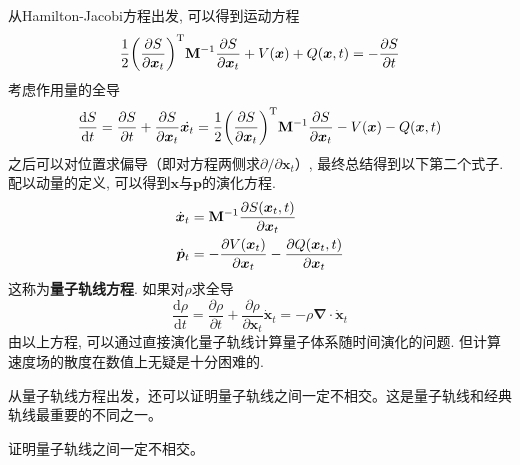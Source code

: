         从Hamilton-Jacobi方程出发, 可以得到运动方程
        \begin{equation}
            \frac 12 \bigg(\frac {\partial S}{\partial \bm{x}_t}\bigg)^{\mathrm{T}} \mathbf{M}^{-1} \frac {\partial S}{\partial \bm{x}_t} + V(\bm{x}) + Q(\bm{x}, t) = -\frac {\partial S}{\partial t}
        \end{equation}
        考虑作用量的全导
        \begin{equation}
            \frac {\mathrm{d}S}{\mathrm{d}t} = \frac {\partial S}{\partial t} + \frac {\partial S}{\partial \bm{x}_t} \dot{\bm{x}_t} = \frac 12 \bigg(\frac {\partial S}{\partial \bm{x}_t}\bigg)^{\mathrm{T}} \mathbf{M}^{-1} \frac {\partial S}{\partial \bm{x}_t} - V(\bm{x}) - Q(\bm{x}, t)
        \end{equation}
        之后可以对位置求偏导（即对方程两侧求${\partial} / {\partial \bm{x}_t}$）, 最终总结得到以下第二个式子. 配以动量的定义, 可以得到$\bm{x}$与$\bm{p}$的演化方程. 
        \begin{equation}\begin{aligned}
            \dot{\bm{x}}_t &= \mathbf{M}^{-1} \frac {\partial S(\bm{x}_t,t)}{\partial \bm{x}_t} \\
            \dot{\bm{p}}_t &= -\frac {\partial V(\bm{x}_t)}{\partial \bm{x}_t} - \frac {\partial Q(\bm{x}_t, t)}{\partial \bm{x}_t}
        \end{aligned}\end{equation}
        这称为\textbf{量子轨线方程}. 如果对$\rho$求全导
        \begin{equation}
            \frac {\mathrm{d}\rho}{\mathrm{d}t} = \frac {\partial \rho}{\partial t} + \frac {\partial \rho}{\partial \bm{x}_t} \dot{\bm{x}}_t = -\rho \bm{\nabla} \cdot \dot{\bm{x}}_t
        \end{equation}
        由以上方程, 可以通过直接演化量子轨线计算量子体系随时间演化的问题. 但计算速度场的散度在数值上无疑是十分困难的. 

        从量子轨线方程出发，还可以证明量子轨线之间一定不相交。这是量子轨线和经典轨线最重要的不同之一。

        \begin{asg}
            证明量子轨线之间一定不相交。
        \end{asg}

        
        